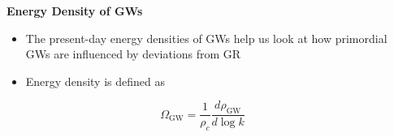 \documentclass{beamer}                             %
\newcommand{\blocktitle}[1]{{\Large \textbf{#1}}}
\begin{document}
\begin{frame}[t]
\begin{columns}[T]
\begin{column}{0.01\textwidth}
  \begin{center}
    \textcolor{darksilver}{\rule[-1cm]{1mm}{0.8\textheight}}
  \end{center}
\end{column}


\begin{column}{0.30\textwidth}
  \begin{tcolorbox}
    \blocktitle{Energy Density of GWs}
    
    \begin{itemize}
        \item The present-day energy densities of GWs help us look at how primordial GWs are influenced by deviations from GR
        \item Energy density is defined as 
    \end{itemize}
    $$\Omega_\text{GW} = \frac{1}{\rho_c}\frac{d \rho_\text{GW}} {d \log{k}}$$


\end{tcolorbox}
\end{column}
\end{columns}
\end{frame}
\end{document}
